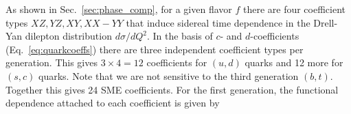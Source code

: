 As shown in Sec.~\ref{sec:phase_comp}, for a given flavor $f$
there are four coefficient types $XZ, YZ, XY, XX-YY$ that induce
sidereal time dependence in the Drell-Yan dilepton distribution 
$d\sigma/dQ^2$. In the basis of $c$- and 
$d$-coefficients (Eq.~\eqref{eq:quarkcoeffs}) there are
three independent coefficient types per generation. This gives
$3\times 4 = 12$ coefficients for $(u,d)$ quarks and 12 more 
for $(s,c)$ quarks. Note that we are not sensitive to 
the third generation $(b,t)$. Together this gives 24 SME coefficients.
%
For the first generation, the functional dependence attached to 
each coefficient is given by
%
